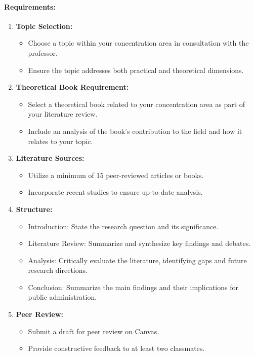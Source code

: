 \documentclass[12pt, letterpaper]{article}
\begin{document}
\paragraph*{Requirements:}
\begin{enumerate}
    \item \textbf{Topic Selection:}
    \begin{itemize}
        \item Choose a topic within your concentration area in consultation with the professor.
        \item Ensure the topic addresses both practical and theoretical dimensions.
    \end{itemize}
    \item \textbf{Theoretical Book Requirement:}
    \begin{itemize}
        \item Select a theoretical book related to your concentration area as part of your literature review.
        \item Include an analysis of the book's contribution to the field and how it relates to your topic.
    \end{itemize}
    \item \textbf{Literature Sources:}
    \begin{itemize}
        \item Utilize a minimum of 15 peer-reviewed articles or books.
        \item Incorporate recent studies to ensure up-to-date analysis.
    \end{itemize}
    \item \textbf{Structure:}
    \begin{itemize}
        \item Introduction: State the research question and its significance.
        \item Literature Review: Summarize and synthesize key findings and debates.
        \item Analysis: Critically evaluate the literature, identifying gaps and future research directions.
        \item Conclusion: Summarize the main findings and their implications for public administration.
    \end{itemize}
    \item \textbf{Peer Review:}
    \begin{itemize}
        \item Submit a draft for peer review on Canvas.
        \item Provide constructive feedback to at least two classmates.

\end{itemize}
\end{enumerate}
\end{document}
